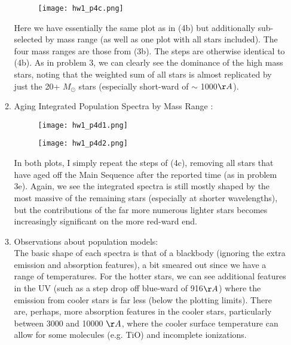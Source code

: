 \documentclass[11pt]{article}
\begin{document}
\begin{enumerate}
\begin{enumerate}
			  \begin{figure}[H]
  			  		\texttt{[image: hw1\_p4c.png]}
  			  		\label{fig:fig9}
			  \end{figure}
			  
			  
	Here we have essentially the same plot as in (4b) but additionally sub-selected by mass range (as well as one plot with all stars included). The four mass ranges are those from (3b). The steps are otherwise identical to (4b). As in problem 3, we can clearly see the dominance of the high mass stars, noting that the weighted sum of all stars is almost replicated by just the 20+ $M_{\odot}$ stars (especially short-ward of $\sim$ 1000$\AA$).\\

\newpage 
			  
	\item %
		Aging Integrated Population Spectra by Mass Range :

			\begin{figure}[H]
			  		\texttt{[image: hw1\_p4d1.png]}
			  		\label{fig:fig10}
			\end{figure}
			
			\begin{figure}[H]
			  		\texttt{[image: hw1\_p4d2.png]}
			  		\label{fig:fig11}
			\end{figure}

	In both plots, I simply repeat the steps of (4c), removing all stars that have aged off the Main Sequence after the reported time (as in problem 3e). Again, we see the integrated spectra is still mostly shaped by the most massive of the remaining stars (especially at shorter wavelengths), but the contributions of the far more numerous lighter stars becomes increasingly significant on the more red-ward end.\\

	\item %
		Observations about population models:\\
		
		The basic shape of each spectra is that of a blackbody (ignoring the extra emission and absorption features), a bit smeared out since we have a range of temperatures. For the hotter stars, we can see additional features in the UV (such as a step drop off blue-ward of 916$\AA$) where the emission from cooler stars is far less (below the plotting limits). There are, perhaps, more absorption features in the cooler stars, particularly between 3000 and 10000 $\AA$, where the cooler surface temperature can allow for some molecules (e.g. TiO) and incomplete ionizations.\\
		

\end{enumerate}
\end{enumerate}
\end{document}
